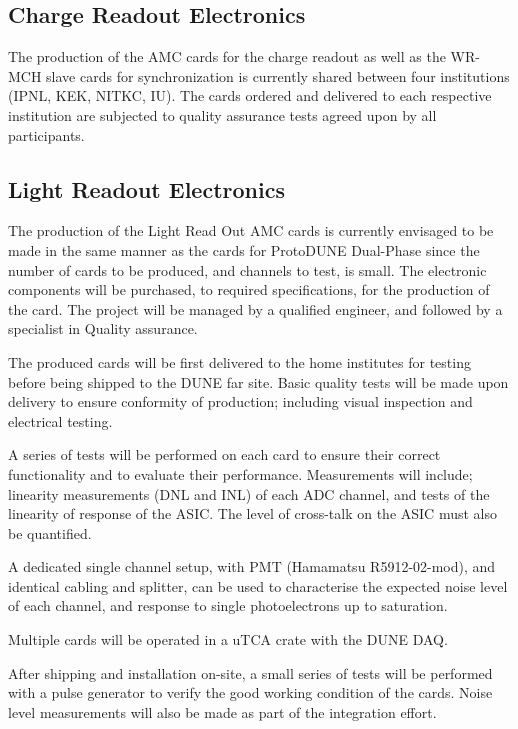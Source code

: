 \subsection{Charge Readout Electronics}
\label{sec:fddp-tpc-elec-prod-cro}
The production of the AMC cards for the charge readout as well as the WR-MCH slave cards for synchronization is currently shared between four institutions (IPNL, KEK, NITKC, IU). The cards ordered and delivered to each respective institution are subjected to quality assurance tests agreed upon by all participants.  

\subsection{Light Readout Electronics}
\label{sec:fddp-tpc-elec-prod-lro}

The production of the Light Read Out AMC cards is currently envisaged to be made in the same manner as the cards for ProtoDUNE Dual-Phase since the number of cards to be produced, and channels to test, is small. The electronic components will be purchased, to required specifications, for the production of the card. The project will be managed by a qualified engineer, and followed by a specialist in Quality assurance.

The produced cards will be first delivered to the home institutes for testing before being shipped to the DUNE far site.  Basic quality tests will be made upon delivery to ensure conformity of production; including visual inspection and electrical testing.

A series of tests will be performed on each card to ensure their correct functionality and to evaluate their performance. Measurements will include; linearity measurements (DNL and INL) of each ADC channel, and tests of the linearity of response of the ASIC. The level of cross-talk on the ASIC must also be quantified.

A dedicated single channel setup, with PMT (Hamamatsu R5912-02-mod), and identical cabling and splitter, can be used to characterise the expected noise level of each channel, and response to single photoelectrons up to saturation. 

Multiple cards will be operated in a uTCA crate with the DUNE DAQ.

After shipping and installation on-site, a small series of tests will be performed with a pulse generator to verify the good working condition of the cards. Noise level measurements will also be made as part of the integration effort.

